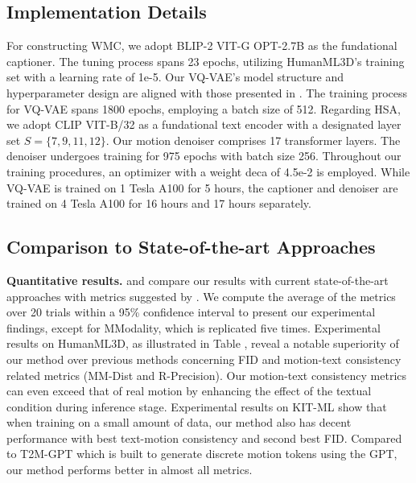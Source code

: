\documentclass[letterpaper]{article} \usepackage{aaai24}
\begin{document}
\subsection{Implementation Details} 









For constructing WMC, we adopt BLIP-2 VIT-G OPT-2.7B as the fundational captioner. The tuning process spans 23 epochs, utilizing HumanML3D's training set with a learning rate of 1e-5. Our VQ-VAE's model structure and hyperparameter design are aligned with those presented in \cite{zhang2023t2mgpt}. The training process for VQ-VAE spans 1800 epochs, employing a batch size of 512. Regarding HSA, we adopt CLIP VIT-B/32 as a fundational text encoder with a designated layer set $S=\{7, 9, 11, 12\}$. Our motion denoiser comprises 17 transformer layers. The denoiser undergoes training for 975 epochs with batch size 256. Throughout our training procedures, an optimizer with a weight deca of 4.5e-2 is employed. While VQ-VAE is trained on 1 Tesla A100 for 5 hours, the captioner and denoiser are trained on 4 Tesla A100 for 16 hours and 17 hours separately.




\subsection{Comparison to State-of-the-art Approaches}

\textbf{Quantitative results.}  and  compare our results with current state-of-the-art approaches \cite{guo2022tm2t,guo2022generating,tevet2022human,zhang2022motiondiffuse, chen2023executing,zhang2023t2mgpt} with metrics suggested by \cite{guo2022generating}. We compute the average of the metrics over 20 trials within a 95\% confidence interval to present our experimental findings, except for MModality, which is replicated five times. Experimental results on HumanML3D, as illustrated in Table , reveal a notable superiority of our method over previous methods concerning FID and  motion-text consistency related metrics (MM-Dist and R-Precision). Our motion-text consistency metrics can even exceed that of real motion by enhancing the effect of the textual condition during inference stage. Experimental results on KIT-ML  show that when training on a small amount of data, our method also has decent performance with best text-motion consistency and second best FID. Compared to T2M-GPT which is built to generate discrete motion tokens using the GPT, our method performs better in almost all metrics.
\end{document}
